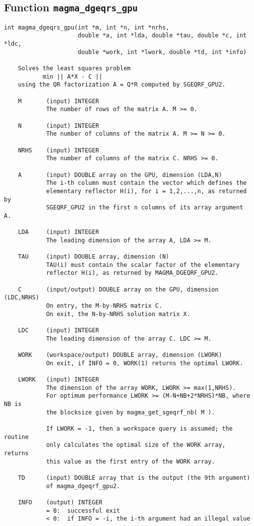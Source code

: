 \documentclass[10pt]{book}
\begin{document}
\subsection{Function {\tt {\bf magma\_dgeqrs\_gpu}}}
\begin{verbatim}
int magma_dgeqrs_gpu(int *m, int *n, int *nrhs,
                     double *a, int *lda, double *tau, double *c, int *ldc,
                     double *work, int *lwork, double *td, int *info)

    Solves the least squares problem
           min || A*X - C ||
    using the QR factorization A = Q*R computed by SGEQRF_GPU2.

    M       (input) INTEGER
            The number of rows of the matrix A. M >= 0.

    N       (input) INTEGER
            The number of columns of the matrix A. M >= N >= 0.

    NRHS    (input) INTEGER
            The number of columns of the matrix C. NRHS >= 0.

    A       (input) DOUBLE array on the GPU, dimension (LDA,N)
            The i-th column must contain the vector which defines the
            elementary reflector H(i), for i = 1,2,...,n, as returned by
            SGEQRF_GPU2 in the first n columns of its array argument A.

    LDA     (input) INTEGER
            The leading dimension of the array A, LDA >= M.

    TAU     (input) DOUBLE array, dimension (N)
            TAU(i) must contain the scalar factor of the elementary
            reflector H(i), as returned by MAGMA_DGEQRF_GPU2.

    C       (input/output) DOUBLE array on the GPU, dimension (LDC,NRHS)
            On entry, the M-by-NRHS matrix C.
            On exit, the N-by-NRHS solution matrix X.

    LDC     (input) INTEGER
            The leading dimension of the array C. LDC >= M.

    WORK    (workspace/output) DOUBLE array, dimension (LWORK)
            On exit, if INFO = 0, WORK(1) returns the optimal LWORK.

    LWORK   (input) INTEGER
            The dimension of the array WORK, LWORK >= max(1,NRHS).
            For optimum performance LWORK >= (M-N+NB+2*NRHS)*NB, where NB is
            the blocksize given by magma_get_sgeqrf_nb( M ).

            If LWORK = -1, then a workspace query is assumed; the routine
            only calculates the optimal size of the WORK array, returns
            this value as the first entry of the WORK array.

    TD      (input) DOUBLE array that is the output (the 9th argument)
            of magma_dgeqrf_gpu2.

    INFO    (output) INTEGER
            = 0:  successful exit
            < 0:  if INFO = -i, the i-th argument had an illegal value
\end{verbatim}
\end{document}

